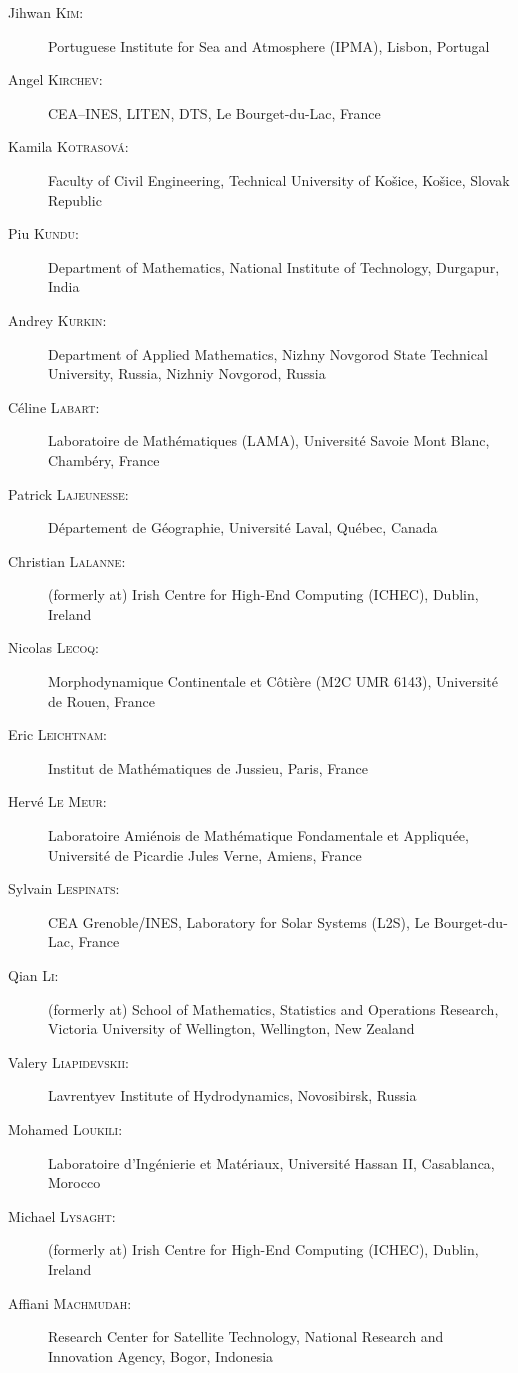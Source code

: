 \documentclass[final, a4paper, oneside, 12pt]{article}
\numberwithin{equation}{section}
\begin{document}
\begin{description}
  \item[Jihwan \textsc{Kim}:] Portuguese Institute for Sea and Atmosphere (IPMA), Lisbon, Portugal 
  \item[Angel \textsc{Kirchev}:] CEA--INES, LITEN, DTS, Le Bourget-du-Lac, France
  \item[Kamila \textsc{Kotrasová}:] Faculty of Civil Engineering, Technical University of Košice, Košice, Slovak Republic
  \item[Piu \textsc{Kundu}:] Department of Mathematics, National Institute of Technology, Durgapur, India
  \item[Andrey \textsc{Kurkin}:] Department of Applied Mathematics, Nizhny Novgorod State Technical University, Russia, Nizhniy Novgorod, Russia
  \item[C\'eline \textsc{Labart}:] Laboratoire de Math\'ematiques (LAMA), Universit\'e Savoie Mont Blanc, Chamb\'ery, France
  \item[Patrick \textsc{Lajeunesse}:] D\'epartement de G\'eographie, Universit\'e Laval, Qu\'ebec, Canada
  \item[Christian \textsc{Lalanne}:] (formerly at) Irish Centre for High-End Computing (ICHEC), Dublin, Ireland
  \item[Nicolas \textsc{Lecoq}:] Morphodynamique Continentale et C\^oti\`ere (M2C UMR 6143), Universit\'e de Rouen, France
  \item[Eric \textsc{Leichtnam}:] Institut de Math\'ematiques de Jussieu, Paris, France
  \item[Herv\'e \textsc{Le Meur}:] Laboratoire Ami\'enois de Math\'ematique Fondamentale et Appliqu\'ee, Universit\'e de Picardie Jules Verne, Amiens, France
  \item[Sylvain \textsc{Lespinats}:] CEA Grenoble/INES, Laboratory for Solar Systems (L2S), Le Bourget-du-Lac, France
  \item[Qian \textsc{Li}:] (formerly at) School of Mathematics, Statistics and Operations Research, Victoria University of Wellington, Wellington, New Zealand
  \item[Valery \textsc{Liapidevskii}:] Lavrentyev Institute of Hydrodynamics, Novosibirsk, Russia
  \item[Mohamed \textsc{Loukili}:] Laboratoire d'Ing\'enierie et Mat\'eriaux, Universit\'e Hassan II, Casablanca, Morocco
  \item[Michael \textsc{Lysaght}:] (formerly at) Irish Centre for High-End Computing (ICHEC), Dublin, Ireland
  \item[Affiani \textsc{Machmudah}:] Research Center for Satellite Technology, National Research and Innovation Agency, Bogor, Indonesia

\end{description}
\end{document}
